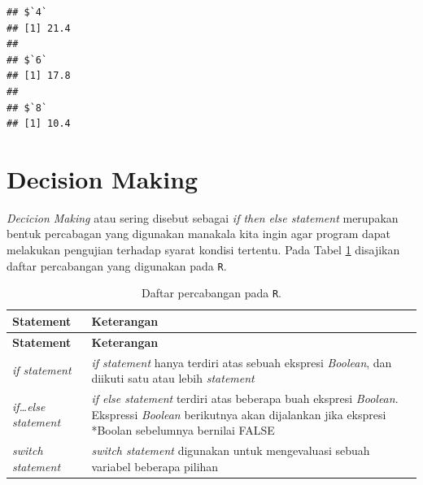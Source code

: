 \documentclass[]{book}
\theoremstyle{definition}
\theoremstyle{definition}
\theoremstyle{definition}
\theoremstyle{remark}
\begin{document}
\begin{verbatim}
## $`4`
## [1] 21.4
## 
## $`6`
## [1] 17.8
## 
## $`8`
## [1] 10.4
\end{verbatim}

\hypertarget{dm}{%
\section{Decision Making}\label{dm}}

\emph{Decicion Making} atau sering disebut sebagai \emph{if then else statement} merupakan bentuk percabagan yang digunakan manakala kita ingin agar program dapat melakukan pengujian terhadap syarat kondisi tertentu. Pada Tabel \ref{tab:percabangan} disajikan daftar percabangan yang digunakan pada \texttt{R}.

\begin{longtable}[]{@{}ll@{}}
\caption{\label{tab:percabangan} Daftar percabangan pada \texttt{R}.}\tabularnewline
\toprule
\begin{minipage}[b]{0.15\columnwidth}\raggedright
\textbf{Statement}\strut
\end{minipage} & \begin{minipage}[b]{0.79\columnwidth}\raggedright
\textbf{Keterangan}\strut
\end{minipage}\tabularnewline
\midrule
\endfirsthead
\toprule
\begin{minipage}[b]{0.15\columnwidth}\raggedright
\textbf{Statement}\strut
\end{minipage} & \begin{minipage}[b]{0.79\columnwidth}\raggedright
\textbf{Keterangan}\strut
\end{minipage}\tabularnewline
\midrule
\endhead
\begin{minipage}[t]{0.15\columnwidth}\raggedright
\emph{if statement}\strut
\end{minipage} & \begin{minipage}[t]{0.79\columnwidth}\raggedright
\emph{if statement} hanya terdiri atas sebuah ekspresi \emph{Boolean}, dan diikuti satu atau lebih \emph{statement}\strut
\end{minipage}\tabularnewline
\begin{minipage}[t]{0.15\columnwidth}\raggedright
\emph{if\ldots{}else statement}\strut
\end{minipage} & \begin{minipage}[t]{0.79\columnwidth}\raggedright
\emph{if else statement} terdiri atas beberapa buah ekspresi \emph{Boolean}. Ekspressi \emph{Boolean} berikutnya akan dijalankan jika ekspresi *Boolan sebelumnya bernilai FALSE\strut
\end{minipage}\tabularnewline
\begin{minipage}[t]{0.15\columnwidth}\raggedright
\emph{switch statement}\strut
\end{minipage} & \begin{minipage}[t]{0.79\columnwidth}\raggedright
\emph{switch statement} digunakan untuk mengevaluasi sebuah variabel beberapa pilihan\strut
\end{minipage}\tabularnewline
\bottomrule
\end{longtable}
\end{document}
